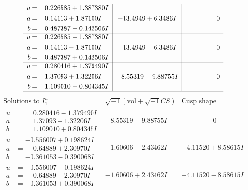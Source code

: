 \documentclass[1p]{elsarticle_modified}
\theoremstyle{definition}
\newcommand{\I}{\sqrt{-1}}
\begin{document}
$$\begin{array}{c|c|c}
\begin{aligned}
u &= \phantom{-}0.226585 + 1.387380 I \\
a &= \phantom{-}0.14113 + 1.87100 I \\
b &= \phantom{-}0.487387 - 0.142506 I\end{aligned}
 & -13.4949 + 6.3486 I & \phantom{-0.000000 } 0 \\ \hline\begin{aligned}
u &= \phantom{-}0.226585 - 1.387380 I \\
a &= \phantom{-}0.14113 - 1.87100 I \\
b &= \phantom{-}0.487387 + 0.142506 I\end{aligned}
 & -13.4949 - 6.3486 I & \phantom{-0.000000 } 0 \\ \hline\begin{aligned}
u &= \phantom{-}0.280416 + 1.379490 I \\
a &= \phantom{-}1.37093 + 1.32206 I \\
b &= \phantom{-}1.109010 - 0.804345 I\end{aligned}
 & -8.55319 + 9.88755 I & \phantom{-0.000000 } 0\\
 \hline 
 \end{array}$$\newpage$$\begin{array}{c|c|c}  
\text{Solutions to }I^u_{1}& \I (\text{vol} + \sqrt{-1}CS) & \text{Cusp shape}\\
 \hline 
\begin{aligned}
u &= \phantom{-}0.280416 - 1.379490 I \\
a &= \phantom{-}1.37093 - 1.32206 I \\
b &= \phantom{-}1.109010 + 0.804345 I\end{aligned}
 & -8.55319 - 9.88755 I & \phantom{-0.000000 } 0 \\ \hline\begin{aligned}
u &= -0.556007 + 0.198624 I \\
a &= \phantom{-}0.64889 + 2.30970 I \\
b &= -0.361053 - 0.390068 I\end{aligned}
 & -1.60606 - 2.43462 I & -4.11520 + 8.58615 I \\ \hline\begin{aligned}
u &= -0.556007 - 0.198624 I \\
a &= \phantom{-}0.64889 - 2.30970 I \\
b &= -0.361053 + 0.390068 I\end{aligned}
 & -1.60606 + 2.43462 I & -4.11520 - 8.58615 I \\ \hline\begin{aligned}

\end{aligned}
\end{array}$$
\end{document}
